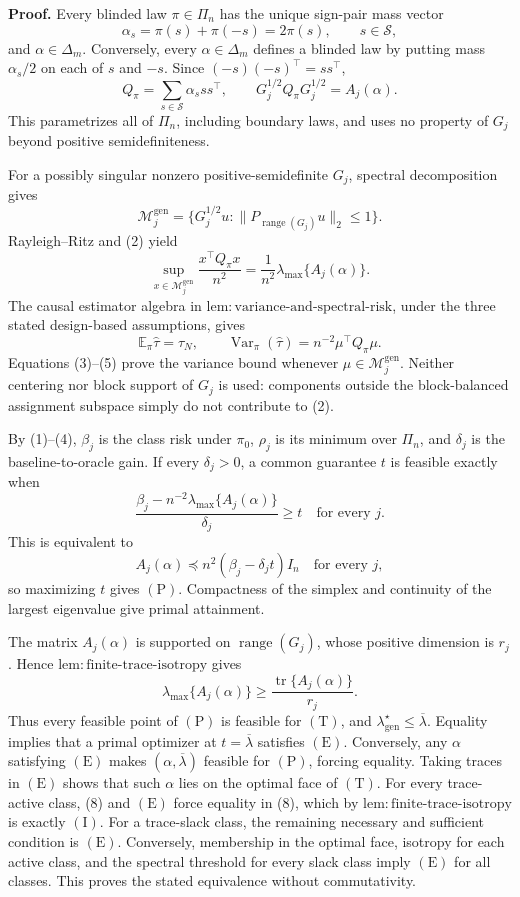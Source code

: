 \textbf{Proof.}
Every blinded law \(\pi\in\Pi_n\) has the unique sign-pair mass vector
\[
\alpha_s=\pi(s)+\pi(-s)=2\pi(s),
\qquad s\in\mathscr S,
\tag{1}
\]
and \(\alpha\in\Delta_m\). Conversely, every \(\alpha\in\Delta_m\) defines a blinded law by putting mass \(\alpha_s/2\) on each of \(s\) and \(-s\). Since \((-s)(-s)^\top=ss^\top\),
\[
Q_\pi=\sum_{s\in\mathscr S}\alpha_sss^\top,
\qquad
G_j^{1/2}Q_\pi G_j^{1/2}=A_j(\alpha).
\tag{2}
\]
This parametrizes all of \(\Pi_n\), including boundary laws, and uses no property of \(G_j\) beyond positive semidefiniteness.

For a possibly singular nonzero positive-semidefinite \(G_j\), spectral decomposition gives
\[
\mathcal M_j^{\mathrm{gen}}
=\{G_j^{1/2}u:\|P_{\operatorname{range}(G_j)}u\|_2\le1\}.
\tag{3}
\]
Rayleigh--Ritz and (2) yield
\[
\sup_{x\in\mathcal M_j^{\mathrm{gen}}}\frac{x^\top Q_\pi x}{n^2}
=\frac1{n^2}\lambda_{\max}\{A_j(\alpha)\}.
\tag{4}
\]
The causal estimator algebra in \(\mathrm{lem:variance\text{-}and\text{-}spectral\text{-}risk}\), under the three stated design-based assumptions, gives
\[
\mathbb E_\pi\widehat\tau=\tau_N,
\qquad
\operatorname{Var}_\pi(\widehat\tau)=n^{-2}\mu^\top Q_\pi\mu.
\tag{5}
\]
Equations (3)--(5) prove the variance bound whenever \(\mu\in\mathcal M_j^{\mathrm{gen}}\). Neither centering nor block support of \(G_j\) is used: components outside the block-balanced assignment subspace simply do not contribute to (2).

By (1)--(4), \(\beta_j\) is the class risk under \(\pi_0\), \(\rho_j\) is its minimum over \(\Pi_n\), and \(\delta_j\) is the baseline-to-oracle gain. If every \(\delta_j>0\), a common guarantee \(t\) is feasible exactly when
\[
\frac{\beta_j-n^{-2}\lambda_{\max}\{A_j(\alpha)\}}{\delta_j}\ge t
\quad\text{for every }j.
\tag{6}
\]
This is equivalent to
\[
A_j(\alpha)\preceq n^2(\beta_j-\delta_jt)I_n
\quad\text{for every }j,
\tag{7}
\]
so maximizing \(t\) gives \((\mathrm P)\). Compactness of the simplex and continuity of the largest eigenvalue give primal attainment.

The matrix \(A_j(\alpha)\) is supported on \(\operatorname{range}(G_j)\), whose positive dimension is \(r_j\). Hence \(\mathrm{lem:finite\text{-}trace\text{-}isotropy}\) gives
\[
\lambda_{\max}\{A_j(\alpha)\}
\ge\frac{\operatorname{tr}\{A_j(\alpha)\}}{r_j}.
\tag{8}
\]
Thus every feasible point of \((\mathrm P)\) is feasible for \((\mathrm T)\), and \(\lambda_{\mathrm{gen}}^\star\le\overline\lambda\). Equality implies that a primal optimizer at \(t=\overline\lambda\) satisfies \((\mathrm E)\). Conversely, any \(\alpha\) satisfying \((\mathrm E)\) makes \((\alpha,\overline\lambda)\) feasible for \((\mathrm P)\), forcing equality. Taking traces in \((\mathrm E)\) shows that such \(\alpha\) lies on the optimal face of \((\mathrm T)\). For every trace-active class, (8) and \((\mathrm E)\) force equality in (8), which by \(\mathrm{lem:finite\text{-}trace\text{-}isotropy}\) is exactly \((\mathrm I)\). For a trace-slack class, the remaining necessary and sufficient condition is \((\mathrm E)\). Conversely, membership in the optimal face, isotropy for each active class, and the spectral threshold for every slack class imply \((\mathrm E)\) for all classes. This proves the stated equivalence without commutativity.

